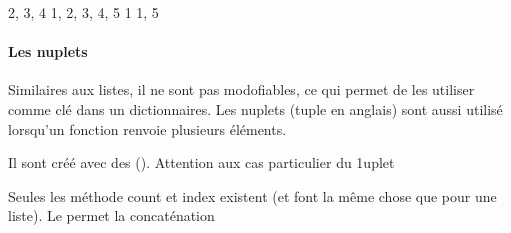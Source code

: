 \documentclass[letterpaper,10pt,english]{sphinxhowto}
\begin{document}
\begin{sphinxVerbatim}[commandchars=\\\{\}]
     
     

  
  
  
  
\end{sphinxVerbatim}

\begin{sphinxVerbatim}[commandchars=\\\{\}]
\PYGZob{}2, 3, 4\PYGZcb{}
\PYGZob{}1, 2, 3, 4, 5\PYGZcb{}
\PYGZob{}1\PYGZcb{}
\PYGZob{}1, 5\PYGZcb{}
\end{sphinxVerbatim}


\paragraph{Les n\sphinxhyphen{}uplets}
\label{\detokenize{cours3_conteneur_cours:les-n-uplets}}
\sphinxAtStartPar
Similaires aux listes, il ne sont pas modofiables, ce qui permet de les utiliser comme clé dans un dictionnaires. Les n\sphinxhyphen{}uplets (tuple en anglais) sont aussi utilisé lorsqu’un fonction renvoie plusieurs éléments.

\sphinxAtStartPar
Il sont créé avec des (). Attention aux cas particulier du 1\sphinxhyphen{}uplet

\begin{sphinxVerbatim}[commandchars=\\\{\}]
   
   
    
\end{sphinxVerbatim}

\sphinxAtStartPar
Seules les méthode count et index existent (et font la même chose que pour une liste).
Le \sphinxcode{\sphinxupquote{+}} permet la concaténation
\end{document}
